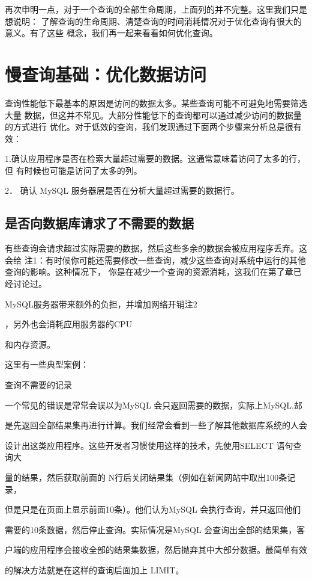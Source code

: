 再次申明一点，对于一个查询的全部生命周期，上面列的并不完整。这里我们只是想说明：
了解查询的生命周期、清楚查询的时间消耗情况对于优化查询有很大的意义。有了这些
概念，我们再一起来看看如何优化查询。

\section{慢查询基础：优化数据访问}
查询性能低下最基本的原因是访问的数据太多。某些查询可能不可避免地需要筛选大量
数据，但这并不常见。大部分性能低下的查询都可以通过减少访问的数据量的方式进行
优化。对于低效的查询，我们发现通过下面两个步骤来分析总是很有效：

1.确认应用程序是否在检索大量超过需要的数据。这通常意味着访问了太多的行，但
有时候也可能是访问了太多的列。

2． 确认 MySQL 服务器层是否在分析大量超过需要的数据行。

\subsection{是否向数据库请求了不需要的数据}
有些查询会请求超过实际需要的数据，然后这些多余的数据会被应用程序丢弃。这会给
注1：有时候你可能还需要修改一些查询，减少这些查询对系统中运行的其他查询的影响。这种情况下，
你是在减少一个查询的资源消耗，这我们在第了章已经讨论过。

MySQL服务器带来额外的负担，并增加网络开销注2

，另外也会消耗应用服务器的CPU

和内存资源。

这里有一些典型案例：

查询不需要的记录

一个常见的错误是常常会误以为MySQL 会只返回需要的数据，实际上MySQL.𨚫

是先返回全部结果集再进行计算。我们经常会看到一些了解其他数据库系统的人会

设计出这类应用程序。这些开发者习惯使用这样的技术，先使用SELECT 语句查询大

量的结果，然后获取前面的 N行后关闭结果集（例如在新闻网站中取出100条记录，

但是只是在页面上显示前面10条）。他们认为MySQL 会执行查询，并只返回他们

需要的10条数据，然后停止查询。实际情况是MySQL 会查询出全部的结果集，客

户端的应用程序会接收全部的结果集数据，然后抛弃其中大部分数据。最简单有效

的解决方法就是在这样的查询后面加上 LIMIT。


